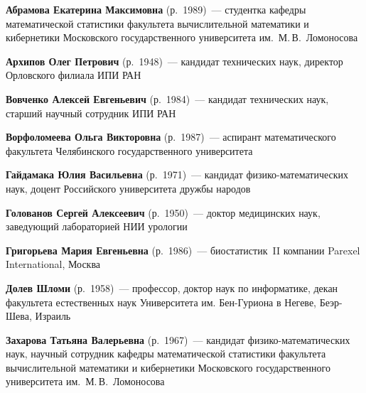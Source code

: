 \begin{multicols}{2}











\noindent 
\textbf{Абрамова Екатерина Максимовна} (р.\ 1989)~--- студентка кафедры математической 
статистики факультета вычислительной математики и кибернетики Московского 
государственного университета им.\ М.\,В.~Ломоносова

\vspace*{3pt}

\noindent 
\textbf{Архипов Олег Петрович} (р.\ 1948)~--- кандидат технических наук, директор 
Орловского филиала ИПИ РАН 

\vspace*{3pt}

\noindent
\textbf{Вовченко Алексей Евгеньевич} (р.\ 1984)~--- 
кандидат технических наук, старший научный сотрудник ИПИ РАН

\vspace*{3pt}


\noindent 
\textbf{Ворфоломеева Ольга Викторовна} (р.\ 1987)~--- аспирант математического факультета 
Челябинского государственного университета

\vspace*{3pt}

\noindent 
\textbf{Гайдамака Юлия Васильевна} (р.\ 1971)~--- кандидат фи\-зи\-ко-ма\-те\-ма\-ти\-че\-ских наук, 
доцент Российского университета дружбы народов

\vspace*{3pt}

\noindent 
\textbf{Голованов Сергей Алексеевич} (р.\ 1950)~--- доктор медицинских наук, заведующий 
лабораторией НИИ урологии 

\noindent 
\textbf{Григорьева Мария Евгеньевна} (р.\ 1986)~--- биостатистик~II компании Parexel 
International, Москва


\vspace*{3pt}

\noindent 
\textbf{Долев Шломи} (р.\ 1958)~--- профессор, доктор наук по информатике, декан факультета 
естественных наук Университета им. Бен-Гуриона в Негеве, Беэр-Ше\-ва, Израиль 

\vspace*{3pt}

\noindent 
\textbf{Захарова Татьяна Валерьевна} (р.\ 1967)~--- кандидат фи\-зи\-ко-ма\-те\-ма\-ти\-че\-ских наук, 
научный сотрудник кафедры математической статистики факультета вычислительной 
математики и кибернетики Московского государственного университета им.\ М.\,В.~Ломоносова


\end{multicols}
